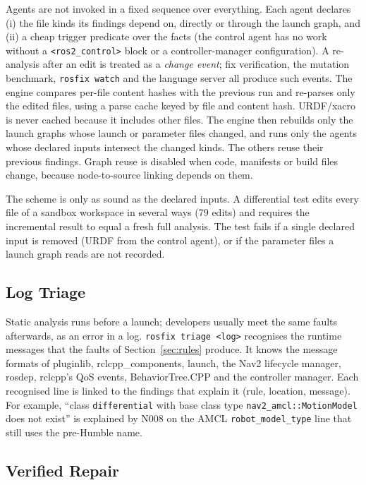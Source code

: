 \documentclass[conference]{IEEEtran}
\newcommand{\code}[1]{\texttt{#1}}
\begin{document}
Agents are not invoked in a fixed sequence over everything. Each agent declares (i) the file
kinds its findings depend on, directly or through the launch graph, and (ii) a cheap trigger
predicate over the facts (the control agent has no work without a \code{<ros2\_control>} block
or a controller-manager configuration). A re-analysis after an edit is treated as a
\emph{change event}; fix verification, the mutation benchmark, \code{rosfix watch} and the
language server all produce such events. The engine compares per-file content hashes with the
previous run and re-parses only the edited files, using a parse cache keyed by file and content
hash. URDF/xacro is never cached because it includes other files. The engine then rebuilds only
the launch graphs whose launch or parameter files changed, and runs only the agents whose
declared inputs intersect the changed kinds. The others reuse their previous findings. Graph reuse is disabled when code, manifests or build files
change, because node-to-source linking depends on them.

The scheme is only as sound as the declared inputs. A differential test edits every file of a
sandbox workspace in several ways (79 edits) and requires the incremental result to equal a
fresh full analysis. The test fails if a single declared input is removed (URDF from the control
agent), or if the parameter files a launch graph reads are not recorded.

\subsection{Log Triage}
\label{sec:triage}

Static analysis runs before a launch; developers usually meet the same faults afterwards, as an
error in a log. \code{rosfix triage <log>} recognises the runtime messages that the faults of
Section~\ref{sec:rules} produce. It knows the message formats of pluginlib, rclcpp\_components,
launch, the Nav2 lifecycle manager, rosdep, rclcpp's QoS events, BehaviorTree.CPP and the
controller manager. Each recognised line is linked to the findings that explain it (rule,
location, message). For example, ``class \code{differential} with base class type
\code{nav2\_amcl::MotionModel} does not exist'' is explained by N008 on the AMCL
\code{robot\_model\_type} line that still uses the pre-Humble name.

\subsection{Verified Repair}
\label{sec:repair}
\end{document}
